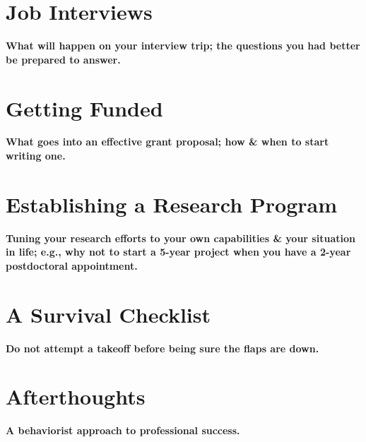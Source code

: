 \documentclass{article}
\numberwithin{equation}{section}
\begin{document}
\section{Job Interviews}

\begin{center}
	\textsf{\textbf{What will happen on your interview trip; the questions you had better be prepared to answer.}}
\end{center}


\section{Getting Funded}

\begin{center}
	\textsf{\textbf{What goes into an effective grant proposal; how \& when to start writing one.}}
\end{center}


\section{Establishing a Research Program}

\begin{center}
	\textsf{\textbf{Tuning your research efforts to your own capabilities \& your situation in life; e.g., why not to start a 5-year project when you have a 2-year postdoctoral appointment.}}
\end{center}


\section{A Survival Checklist}

\begin{center}
	\textsf{\textbf{Do not attempt a takeoff before being sure the flaps are down.}}
\end{center}


\section{Afterthoughts}

\begin{center}
	\textsf{\textbf{A behaviorist approach to professional success.}}
\end{center}


\printbibliography[heading=bibintoc]
	
\end{document}
